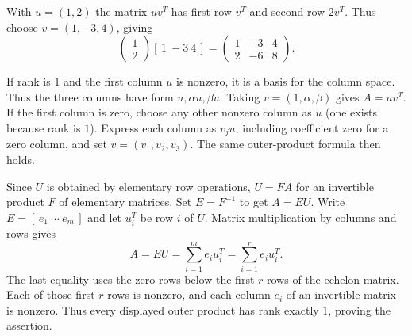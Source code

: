 With $u=(1,2)$ the matrix $uv^T$ has first row $v^T$ and second row $2v^T$.
Thus choose $v=(1,-3,4)$, giving
\[
 \begin{pmatrix}1\\2\end{pmatrix}[\,1\ -3\ 4\,]
 =\begin{pmatrix}1&-3&4\\2&-6&8\end{pmatrix}.
\]

If rank is $1$ and the first column $u$ is nonzero, it is a basis for the
column space. Thus the three columns have form $u,\alpha u,\beta u$.
Taking $v=(1,\alpha,\beta)$ gives $A=uv^T$.
If the first column is zero, choose any other nonzero column as $u$ (one
exists because rank is $1$). Express each column as $v_j u$, including
coefficient zero for a zero column, and set $v=(v_1,v_2,v_3)$.
The same outer-product formula then holds.

Since $U$ is obtained by elementary row operations, $U=FA$ for an invertible
product $F$ of elementary matrices. Set $E=F^{-1}$ to get $A=EU$.
Write $E=[\,e_1\ \cdots\ e_m\,]$ and let $u_i^T$ be row $i$ of $U$.
Matrix multiplication by columns and rows gives
\[
 A=EU=\sum_{i=1}^m e_i u_i^T=\sum_{i=1}^r e_i u_i^T.
\]
The last equality uses the zero rows below the first $r$ rows of the echelon
matrix. Each of those first $r$ rows is nonzero, and each column $e_i$ of
an invertible matrix is nonzero. Thus every displayed outer product has
rank exactly $1$, proving the assertion.

